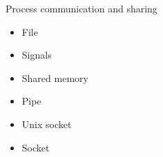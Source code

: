 \begin{frame}{Process communication and sharing}
  \begin{center}
    \begin{itemize}
      \item File
      \item Signals
      \item Shared memory
      \item Pipe
      \item Unix socket
      \item Socket
      \end{itemize}
  \end{center}
\end{frame}